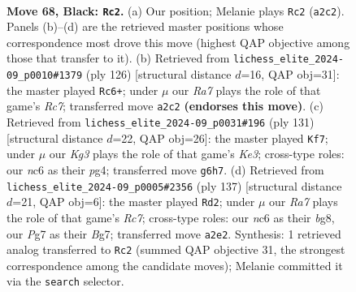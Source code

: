 \documentclass[11pt]{article}
\begin{document}
\clearpage

\begin{figure}[p]\centering
\begin{subfigure}{0.46\textwidth}\centering
\resizebox{\linewidth}{!}{%
\newchessgame
\chessboard[
  setfen={8/1R4p1/2N2pk1/7p/3P3P/6PK/r7/8 b - - 30 68},
  showmover=false,
  pgfstyle=straightmove, color=movearrow, markmove={a2-c2}
]}
\caption{}
\end{subfigure}\hfill
\begin{subfigure}{0.46\textwidth}\centering
\resizebox{\linewidth}{!}{%
\newchessgame
\chessboard[
  setfen={8/2R5/6k1/5p1p/7P/5PK1/1r4P1/8 w - - 46 64},
  showmover=false,
  pgfstyle=straightmove, color=movearrow, markmove={c7-c6}
]}
\caption{}
\end{subfigure}
\\[4pt]
\begin{subfigure}{0.46\textwidth}\centering
\resizebox{\linewidth}{!}{%
\newchessgame
\chessboard[
  setfen={8/R3p3/3pkp2/1r6/4P1P1/4PK2/8/8 b - - 46 66},
  showmover=false,
  pgfstyle=straightmove, color=movearrow, markmove={e6-f7}
]}
\caption{}
\end{subfigure}\hfill
\begin{subfigure}{0.46\textwidth}\centering
\resizebox{\linewidth}{!}{%
\newchessgame
\chessboard[
  setfen={6B1/4R1b1/6pk/7p/7P/6PK/2r5/8 b - - 42 69},
  showmover=false,
  pgfstyle=straightmove, color=movearrow, markmove={c2-d2}
]}
\caption{}
\end{subfigure}
\caption{\textbf{Move 68, Black: \texttt{Rc2}.} (a) Our position; Melanie plays \texttt{Rc2} (\texttt{a2c2}). Panels (b)--(d) are the retrieved master positions whose correspondence most drove this move (highest QAP objective among those that transfer to it). (b) Retrieved from \texttt{lichess\_elite\_2024-09\_p0010\#1379} (ply 126) [structural distance $d$=16, QAP obj=31]: the master played \texttt{Rc6+}; under $\mu$ our \emph{Ra7} plays the role of that game's \emph{Rc7}; transferred move \texttt{a2c2} \textbf{(endorses this move)}. (c) Retrieved from \texttt{lichess\_elite\_2024-09\_p0031\#196} (ply 131) [structural distance $d$=22, QAP obj=26]: the master played \texttt{Kf7}; under $\mu$ our \emph{Kg3} plays the role of that game's \emph{Ke3}; cross-type roles: our \emph{n}c6 as their \emph{p}g4; transferred move \texttt{g6h7}. (d) Retrieved from \texttt{lichess\_elite\_2024-09\_p0005\#2356} (ply 137) [structural distance $d$=21, QAP obj=6]: the master played \texttt{Rd2}; under $\mu$ our \emph{Ra7} plays the role of that game's \emph{Rc7}; cross-type roles: our \emph{n}c6 as their \emph{b}g8, our \emph{P}g7 as their \emph{B}g7; transferred move \texttt{a2e2}. Synthesis: 1 retrieved analog transferred to \texttt{Rc2} (summed QAP objective 31, the strongest correspondence among the candidate moves); Melanie committed it via the \texttt{search} selector.}
\label{fig:thought-m135}
\end{figure}
\end{document}
